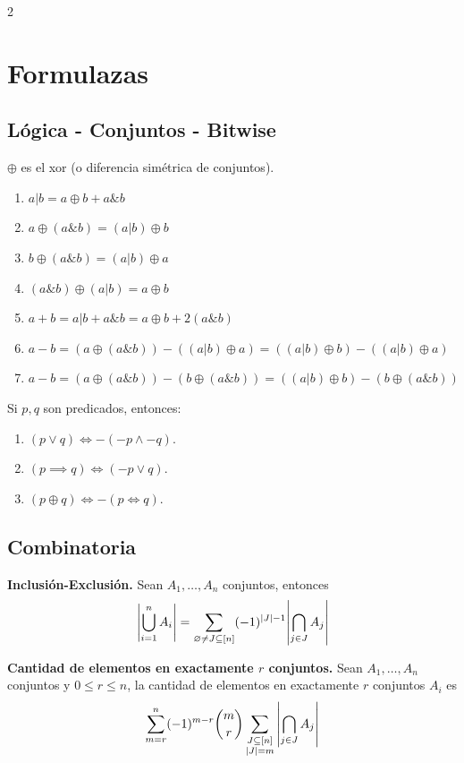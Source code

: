 \documentclass[10pt,spanish,mexico]{article}
\numberwithin{equation}{section}
\begin{document}
\begin{multicols}{2}
\section{Formulazas}

\subsection{Lógica - Conjuntos - Bitwise}
$\oplus$ es el xor (o diferencia simétrica de conjuntos).
\begin{enumerate}[1.]
    \item $a|b = a\oplus b + a \& b$
    \item $a\oplus (a\&b) = (a|b)\oplus b$
    \item $b\oplus (a\&b) = (a|b)\oplus a$
    \item $(a\&b)\oplus (a|b) = a\oplus b$
    \item $a + b = a|b + a\&b = a\oplus b + 2(a\&b)$
    \item $a - b = (a\oplus (a\&b))-((a|b)\oplus a) = ((a|b)\oplus b)-((a|b)\oplus a)$
    \item $a - b = (a\oplus (a\&b))-(b\oplus (a\&b)) = ((a|b)\oplus b)-(b\oplus (a\&b))$
\end{enumerate}

Si $p, q$ son predicados, entonces:
\begin{enumerate}[1.]
    \item $(p \vee q) \iff -(-p \wedge -q)$.
    \item $(p \implies q) \iff (-p \vee q)$.
    \item $(p \oplus q) \iff -(p \iff q)$.
\end{enumerate}

\subsection{Combinatoria}

\textbf{Inclusión-Exclusión.} Sean $A_1, \dots, A_n$ conjuntos, entonces
$$\abs{\bigcup_{i = 1}^n A_i} = \sum_{\varnothing \neq J \subseteq [n]} (-1)^{|J| - 1}\abs{\bigcap_{j \in J} A_j}$$

\textbf{Cantidad de elementos en exactamente $r$ conjuntos.} Sean $A_1, \dots, A_n$ conjuntos y $0 \leq r \leq n$, la cantidad de elementos en exactamente $r$ conjuntos $A_i$ es
$$\sum_{m = r}^n (-1)^{m - r}\binom{m}{r}\sum_{\substack{J \subseteq [n]\\|J| = m}} \abs{\bigcap_{j \in J} A_j}$$


\end{multicols}
\end{document}
